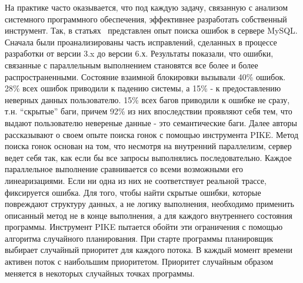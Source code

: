 На практике часто оказывается, что под каждую задачу, связанную с анализом системного программного обеспечения, эффективнее разработать собственный инструмент.
Так, в статьях~\cite{Fonseca:2010,Fonseca:2011} представлен опыт поиска ошибок в сервере MySQL.
Сначала были проанализированы часть исправлений, сделанных в процессе разработки от версии 3.x до версии 6.х.
Результаты показали, что ошибки, связанные с параллельным выполнением становятся все более и более распространенными.
Состояние взаимной блокировки вызывали 40\% ошибок. 28\% всех ошибок приводили к падению системы, а 15\% - к предоставлению неверных данных пользователю.
15\% всех багов приводили к ошибке не сразу, т.н. “скрытые” баги, причем 92\% из них впоследствии проявляют себя тем, что выдают пользователю невереные данные - это семантические баги.
Далее авторы рассказывают о своем опыте поиска гонок с помощью инструмента PIKE.
Метод поиска гонок основан на том, что несмотря на внутренний параллелизм, сервер ведет себя так, как если бы все запросы выполнялись последовательно. 
Каждое параллельное выполнение сравнивается со всеми возможными его линеаризациями.
Если ни одна из них не соответствует реальной трассе, фиксируется ошибка. 
Для того, чтобы найти скрытые ошибки, которые повреждают структуру данных, а не логику выполнения, необходимо применить описанный метод не в конце выполнения, а для каждого внутреннего состояния программы.
Инструмент PIKE пытается обойти эти ограничения с помощью алгоритма случайного планирования. При старте программы планировщик выбирает случайный приоритет для каждого потока. В каждый момент времени активен поток с наибольшим приоритетом.
Приоритет случайным образом меняется в некоторых случайных точках программы. 

